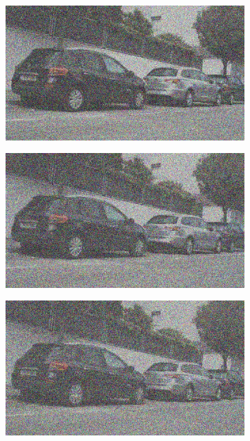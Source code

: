 \documentclass[a4paper]{ctexart}
\begin{document}
\begin{figure}[htbp]
\begin{subfigure}{0.08\textwidth}
			\label{fig：Gamma=0.6, Gauss Noise = 0.7}
		\end{subfigure}
		\begin{subfigure}{0.08\textwidth}
			\captionsetup{font=scriptsize}
			\includegraphics[width=\linewidth]{picture/Edge Detection/degrade/RGB_001 Gamma=0.6, Gauss Noise=0.8}
			\label{fig：Gamma=0.6, Gauss Noise = 0.8}
		\end{subfigure}
		\begin{subfigure}{0.08\textwidth}
			\captionsetup{font=scriptsize}
			\includegraphics[width=\linewidth]{picture/Edge Detection/degrade/RGB_001 Gamma=0.6, Gauss Noise=0.9}
			\label{fig：Gamma=0.6, Gauss Noise = 0.9}
		\end{subfigure}
		\begin{subfigure}{0.08\textwidth}
			\captionsetup{font=scriptsize}
			\includegraphics[width=\linewidth]{picture/Edge Detection/degrade/RGB_001 Gamma=0.6, Gauss Noise=1.0}

\end{subfigure}
\end{figure}
\end{document}
